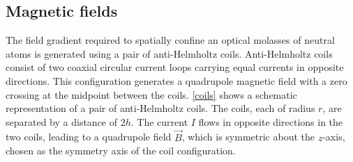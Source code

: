 \documentclass[../Thesis-IJspeert.tex]{subfiles}
\begin{document}
\subsection{Magnetic fields}
\label{magneticfields}
The field gradient required to spatially confine an optical molasses of neutral atoms is generated using a pair of anti-Helmholtz coils. Anti-Helmholtz coils consist of two coaxial circular current loops carrying equal currents in opposite directions. This configuration generates a quadrupole magnetic field with a zero crossing at the midpoint between the coils. \autoref{coils} shows a schematic representation of a pair of anti-Helmholtz coils. The coils, each of radius $r$, are separated by a distance of $2h$. The current $I$ flows in opposite directions in the two coils, leading to a quadrupole field $\vec{B}$, which is symmetric about the $z$-axis, chosen as the symmetry axis of the coil configuration.
\end{document}

